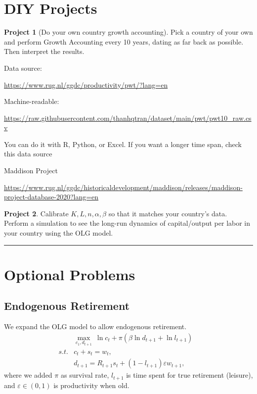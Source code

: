 \documentclass[10pt,a4paper]{book}
\theoremstyle{definition}\newtheorem{definition}{Definition}
\theoremstyle{definition}\newtheorem{fact}{Fact}
\theoremstyle{definition}\newtheorem{ex}{Ex.}
\theoremstyle{definition}\newtheorem{project}{Project}
\theoremstyle{definition}\newtheorem{problem}{Problem}
\theoremstyle{definition}\newtheorem{example}{Example}
\numberwithin{theorem}{chapter}
\numberwithin{corollary}{chapter}
\numberwithin{assumption}{chapter}
\numberwithin{definition}{chapter}
\numberwithin{prop}{chapter}
\numberwithin{notation}{chapter}
\numberwithin{problem}{chapter}
\numberwithin{example}{chapter}
\numberwithin{fact}{chapter}
\numberwithin{ex}{chapter}
\begin{document}
	\section{DIY Projects}
	\begin{project}
		[Do your own country growth accounting]
		
		Pick a country of your own and perform Growth Accounting every 10 years, dating as far back as possible. Then interpret the results.
		
		Data source: 
		
		\href{https://www.rug.nl/ggdc/productivity/pwt/?lang=en}{https://www.rug.nl/ggdc/productivity/pwt/?lang=en}
		
		Machine-readable:
		
		\href{https://raw.githubusercontent.com/thanhqtran/dataset/main/pwt/pwt10_raw.csv}{https://raw.githubusercontent.com/thanhqtran/dataset/main/pwt/pwt10\_raw.csv}
		
		You can do it with R, Python, or Excel. If you want a longer time span, check this data source
		
		Maddison Project
		
		\href{https://www.rug.nl/ggdc/historicaldevelopment/maddison/releases/maddison-project-database-2020?lang=en}{https://www.rug.nl/ggdc/historicaldevelopment/maddison/releases/maddison-project-database-2020?lang=en}
	\end{project}
	
	\begin{project}
		Calibrate $K, L, n, \alpha, \beta$ so that it matches your country's data. Perform a simulation to see the long-run dynamics of capital/output per labor in your country using the OLG model.
	\end{project}
	
	\par\noindent\rule{\textwidth}{0.5pt}
	
	\section{Optional Problems}
	
	\subsection{Endogenous Retirement }
	We expand the OLG model to allow endogenous retirement. 
	\begin{align*}
		& \max_{c_1, d_{t+1}} \ \ln c_t + \pi ( \beta \ln d_{t+1} + \ln l_{t+1} ) \\
		s.t. &c_t + s_t = w_t, &                                                                         \\
		& d_{t+1} = R_{t+1} s_t + (1-l_{t+1}) \varepsilon w_{t+1},                
	\end{align*}
	where we added $\pi$ as survival rate, $l_{t+1}$ is time spent for true retirement (leisure), and $\varepsilon \in (0,1)$ is productivity when old. 
	
\end{document}
